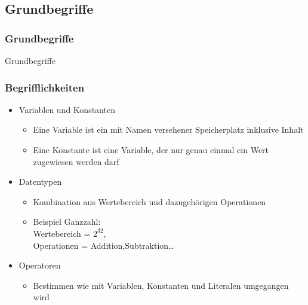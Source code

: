 \subsection{Grundbegriffe}
\begin{frame}[fragile]
	\frametitle{Grundbegriffe}
	\huge Grundbegriffe
\end{frame}

\begin{frame}[fragile]
	\frametitle{Begrifflichkeiten}
	\begin{itemize}
	  \item Variablen und Konstanten
	  	\begin{itemize}
			\item Eine Variable ist ein mit Namen versehener Speicherplatz inklusive Inhalt
			\item Eine Konstante ist eine Variable, der nur genau einmal ein Wert
			zugewiesen werden darf
	    \end{itemize}
	  \item Datentypen
	 	\begin{itemize}
			\item Kombination aus Wertebereich und dazugehörigen Operationen
			\item Beispiel Ganzzahl: 	\\Wertebereich = $2^{32}$, 
										\\Operationen = Addition,Subtraktion\ldots
	    \end{itemize}
	  \item Operatoren
	  	\begin{itemize}
			\item Bestimmen wie mit Variablen, Konstanten und Literalen umgegangen wird
	    \end{itemize}
	 \end{itemize}
\end{frame}

